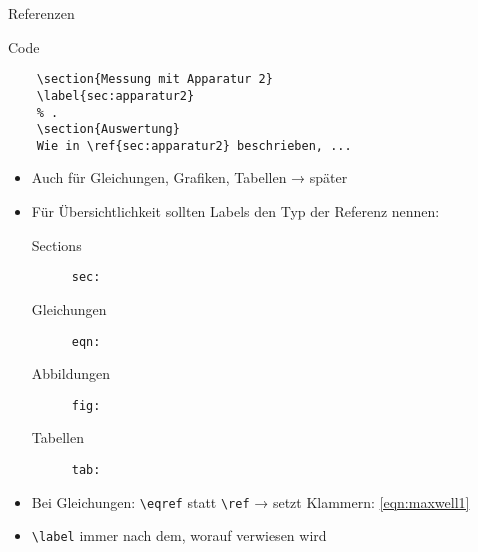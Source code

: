 \begin{frame}[fragile]{Referenzen}
  \begin{block}{Code}
    \begin{lstlisting}
    \section{Messung mit Apparatur 2}
    \label{sec:apparatur2}
    % .
    \section{Auswertung}
    Wie in \ref{sec:apparatur2} beschrieben, ...
    \end{lstlisting}
  \end{block}
  \begin{itemize}
    \item Auch für Gleichungen, Grafiken, Tabellen → später
    \item Für Übersichtlichkeit sollten Labels den Typ der Referenz nennen:
      \begin{description}
        \item[Sections]    \texttt{sec:}
        \item[Gleichungen] \texttt{eqn:}
        \item[Abbildungen] \texttt{fig:}
        \item[Tabellen]    \texttt{tab:}
      \end{description}
    \item Bei Gleichungen: \verb+\eqref+ statt \verb+\ref+ → setzt Klammern: \eqref{eqn:maxwell1}
    \item \verb+\label+ immer nach dem, worauf verwiesen wird
  \end{itemize}
\end{frame}

